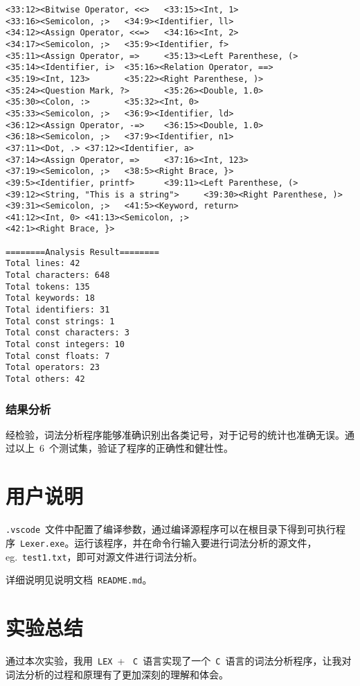 \documentclass[lang=cn,11pt,a4paper]{paper}
\begin{document}
\begin{lstlisting}
<33:12><Bitwise Operator, <<>   <33:15><Int, 1>
<33:16><Semicolon, ;>   <34:9><Identifier, ll>
<34:12><Assign Operator, <<=>   <34:16><Int, 2>
<34:17><Semicolon, ;>   <35:9><Identifier, f>
<35:11><Assign Operator, =>     <35:13><Left Parenthese, (>
<35:14><Identifier, i>  <35:16><Relation Operator, ==>
<35:19><Int, 123>       <35:22><Right Parenthese, )>
<35:24><Question Mark, ?>       <35:26><Double, 1.0>
<35:30><Colon, :>       <35:32><Int, 0>
<35:33><Semicolon, ;>   <36:9><Identifier, ld>
<36:12><Assign Operator, -=>    <36:15><Double, 1.0>
<36:18><Semicolon, ;>   <37:9><Identifier, n1>
<37:11><Dot, .> <37:12><Identifier, a>
<37:14><Assign Operator, =>     <37:16><Int, 123>
<37:19><Semicolon, ;>   <38:5><Right Brace, }>
<39:5><Identifier, printf>      <39:11><Left Parenthese, (>
<39:12><String, "This is a string">     <39:30><Right Parenthese, )>
<39:31><Semicolon, ;>   <41:5><Keyword, return>
<41:12><Int, 0> <41:13><Semicolon, ;>
<42:1><Right Brace, }>

========Analysis Result========
Total lines: 42
Total characters: 648
Total tokens: 135
Total keywords: 18
Total identifiers: 31
Total const strings: 1
Total const characters: 3
Total const integers: 10
Total const floats: 7
Total operators: 23
Total others: 42
\end{lstlisting}

\subsubsection{结果分析}

经检验，词法分析程序能够准确识别出各类记号，对于记号的统计也准确无误。通过以上\ 6\ 个测试集，验证了程序的正确性和健壮性。

\section{用户说明}

\lstinline{.vscode}\ 文件中配置了编译参数，通过编译源程序可以在根目录下得到可执行程序\ \lstinline{Lexer.exe}。运行该程序，并在命令行输入要进行词法分析的源文件，eg.\ \lstinline{test1.txt}，即可对源文件进行词法分析。

详细说明见说明文档\ \lstinline{README.md}。

\section{实验总结}

通过本次实验，我用\ \lstinline{LEX}\ + \ \lstinline{C}\ 语言实现了一个\ \lstinline{C}\ 语言的词法分析程序，让我对词法分析的过程和原理有了更加深刻的理解和体会。
\end{document}
